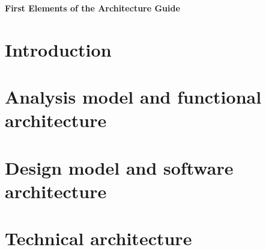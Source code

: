 \documentclass[a4paper,11pt]{book}
\begin{document}
\begin{titlepage}
  \vspace*{2cm}
  \begin{center}
    {\huge \bf First Elements of the Architecture Guide}
    
  \end{center}

\end{titlepage}

\newpage



\cleardoublepage
\tableofcontents
\cleardoublepage
\listoffigures
\cleardoublepage
\listoftables
\cleardoublepage

\chapter{Introduction}

\cleardoublepage

\chapter{Analysis model and functional architecture}

\cleardoublepage

\chapter{Design model and software architecture}

\cleardoublepage

\chapter{Technical architecture}

\cleardoublepage

% 


\nocite{*}

\end{document}
